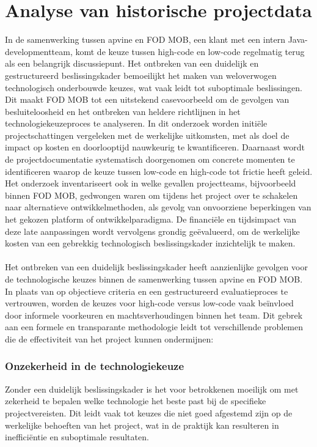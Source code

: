 \section{Analyse van historische projectdata}
In de samenwerking tussen apvine en \gls{FOD MOB}, een klant met een intern Java-developmentteam, komt de keuze tussen high-code en low-code regelmatig terug als een belangrijk discussiepunt. Het ontbreken van een duidelijk en gestructureerd beslissingskader bemoeilijkt het maken van weloverwogen technologisch onderbouwde keuzes, wat vaak leidt tot suboptimale beslissingen. Dit maakt \gls{FOD MOB} tot een uitstekend casevoorbeeld om de gevolgen van besluiteloosheid en het ontbreken van heldere richtlijnen in het technologiekeuzeproces te analyseren. In dit onderzoek worden initiële projectschattingen vergeleken met de werkelijke uitkomsten, met als doel de impact op kosten en doorlooptijd nauwkeurig te kwantificeren. Daarnaast wordt de projectdocumentatie systematisch doorgenomen om concrete momenten te identificeren waarop de keuze tussen low-code en high-code tot frictie heeft geleid. Het onderzoek inventariseert ook in welke gevallen projectteams, bijvoorbeeld binnen \gls{FOD MOB}, gedwongen waren om tijdens het project over te schakelen naar alternatieve ontwikkelmethoden, als gevolg van onvoorziene beperkingen van het gekozen platform of ontwikkelparadigma. De financiële en tijdsimpact van deze late aanpassingen wordt vervolgens grondig geëvalueerd, om de werkelijke kosten van een gebrekkig technologisch beslissingskader inzichtelijk te maken.
\\
\\
Het ontbreken van een duidelijk beslissingskader heeft aanzienlijke gevolgen voor de technologische keuzes binnen de samenwerking tussen apvine en \gls{FOD MOB}. In plaats van op objectieve criteria en een gestructureerd evaluatieproces te vertrouwen, worden de keuzes voor high-code versus low-code vaak beïnvloed door informele voorkeuren en machtsverhoudingen binnen het team. Dit gebrek aan een formele en transparante methodologie leidt tot verschillende problemen die de effectiviteit van het project kunnen ondermijnen:
\subsubsection{Onzekerheid in de technologiekeuze}
Zonder een duidelijk beslissingskader is het voor betrokkenen moeilijk om met zekerheid te bepalen welke technologie het beste past bij de specifieke projectvereisten. Dit leidt vaak tot keuzes die niet goed afgestemd zijn op de werkelijke behoeften van het project, wat in de praktijk kan resulteren in inefficiëntie en suboptimale resultaten.
